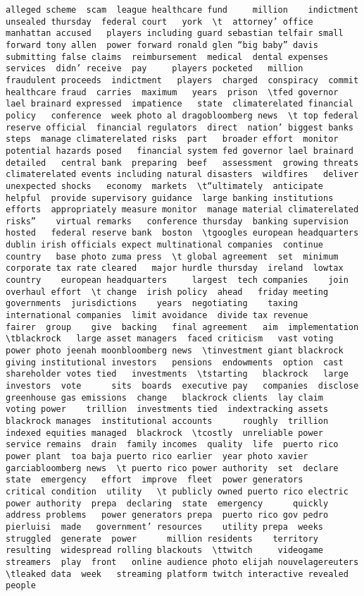 \documentclass[
]{article}
\begin{document}
\begin{verbatim}
alleged scheme  scam  league healthcare fund     million    indictment unsealed thursday  federal court   york  \t  attorney’ office  manhattan accused   players including guard sebastian telfair small forward tony allen  power forward ronald glen “big baby” davis  submitting false claims  reimbursement  medical  dental expenses  services  didn’ receive  pay     players pocketed   million  fraudulent proceeds  indictment   players  charged  conspiracy  commit healthcare fraud  carries  maximum   years  prison  \tfed governor lael brainard expressed  impatience   state  climaterelated financial policy   conference  week photo al dragobloomberg news  \t top federal reserve official  financial regulators  direct  nation’ biggest banks    steps  manage climaterelated risks  part   broader effort  monitor potential hazards posed   financial system fed governor lael brainard detailed   central bank  preparing  beef   assessment  growing threats  climaterelated events including natural disasters  wildfires   deliver unexpected shocks   economy  markets  \t“ultimately  anticipate    helpful  provide supervisory guidance  large banking institutions   efforts  appropriately measure monitor  manage material climaterelated risks”    virtual remarks   conference thursday  banking supervision hosted   federal reserve bank  boston  \tgoogles european headquarters  dublin irish officials expect multinational companies  continue    country   base photo zuma press  \t global agreement  set  minimum  corporate tax rate cleared   major hurdle thursday  ireland  lowtax country    european headquarters     largest  tech companies    join  overhaul effort  \t change  irish policy  ahead   friday meeting   governments  jurisdictions    years  negotiating    taxing international companies  limit avoidance  divide tax revenue       fairer  group    give  backing   final agreement   aim  implementation    \tblackrock   large asset managers  faced criticism   vast voting power photo jeenah moonbloomberg news  \tinvestment giant blackrock   giving institutional investors   pensions  endowments  option  cast shareholder votes tied   investments  \tstarting   blackrock   large investors  vote      sits  boards  executive pay   companies  disclose  greenhouse gas emissions  change   blackrock clients  lay claim  voting power    trillion  investments tied  indextracking assets blackrock manages  institutional accounts      roughly  trillion  indexed equities managed  blackrock  \tcostly  unreliable power service remains  drain  family incomes  quality  life  puerto rico  power plant  toa baja puerto rico earlier  year photo xavier garciabloomberg news  \t puerto rico power authority  set  declare  state  emergency   effort  improve  fleet  power generators     critical condition  utility   \t publicly owned puerto rico electric power authority  prepa  declaring  state  emergency      quickly address problems   power generators prepa  puerto rico gov pedro pierluisi  made   government’ resources    utility prepa  weeks  struggled  generate  power      million residents    territory resulting  widespread rolling blackouts  \ttwitch     videogame streamers  play  front   online audience photo elijah nouvelagereuters  \tleaked data  week   streaming platform twitch interactive revealed   people 
\end{verbatim}
\end{document}
